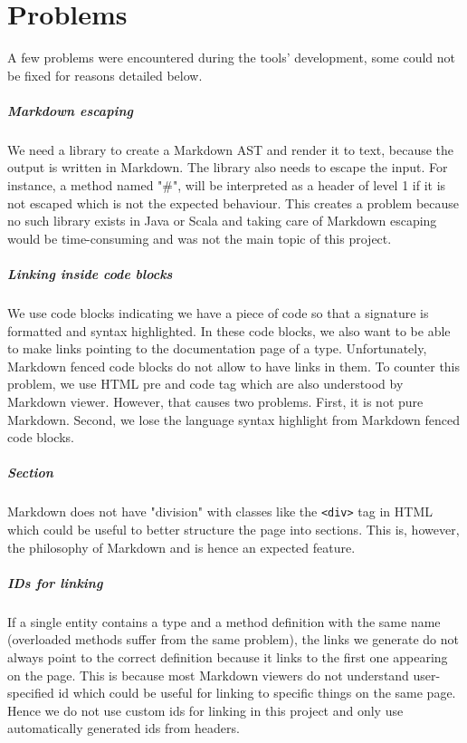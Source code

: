 \documentclass{report}
\begin{document}
\chapter{Problems}
\label{sec:problems}
A few problems were encountered during the tools' development, some could not be fixed for reasons detailed below.

\paragraph{Markdown escaping}
We need a library to create a Markdown AST and render it to text, because the output is written in Markdown. The library also needs to escape the input. For instance, a method named "\#", will be interpreted as a header of level 1 if it is not escaped which is not the expected behaviour. This creates a problem because no such library exists in Java or Scala and taking care of Markdown escaping would be time-consuming and was not the main topic of this project.

\paragraph{Linking inside code blocks}
We use code blocks indicating we have a piece of code so that a signature is formatted and syntax highlighted. In these code blocks, we also want to be able to make links pointing to the documentation page of a type. Unfortunately, Markdown fenced code blocks do not allow to have links in them. To counter this problem, we use HTML pre and code tag which are also understood by Markdown viewer. However, that causes two problems. First, it is not pure Markdown. Second, we lose the language syntax highlight from Markdown fenced code blocks.

\paragraph{Section}
Markdown does not have "division" with classes like the \texttt{<div>} tag in HTML which could be useful to better structure the page into sections. This is, however, the philosophy of Markdown and is hence an expected feature.

\paragraph{IDs for linking}
If a single entity contains a type and a method definition with the same name (overloaded methods suffer from the same problem), the links we generate do not always point to the correct definition because it links to the first one appearing on the page. This is because most Markdown viewers do not understand user-specified id which could be useful for linking to specific things on the same page. Hence we do not use custom ids for linking in this project and only use automatically generated ids from headers.
\end{document}
